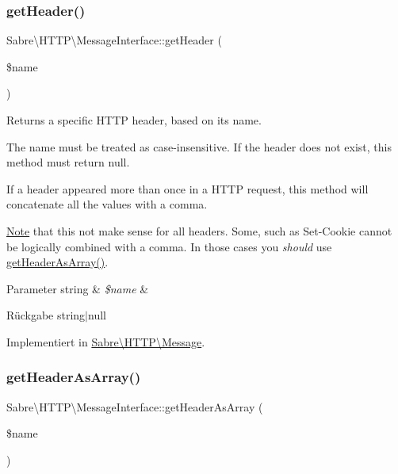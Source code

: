 \subsubsection{\texorpdfstring{get\+Header()}{getHeader()}}
{\footnotesize\ttfamily Sabre\textbackslash{}\+H\+T\+T\+P\textbackslash{}\+Message\+Interface\+::get\+Header (\begin{DoxyParamCaption}\item[{}]{\$name }\end{DoxyParamCaption})}

Returns a specific H\+T\+TP header, based on it\textquotesingle{}s name.

The name must be treated as case-\/insensitive. If the header does not exist, this method must return null.

If a header appeared more than once in a H\+T\+TP request, this method will concatenate all the values with a comma.

\mbox{\hyperlink{class_note}{Note}} that this not make sense for all headers. Some, such as {\ttfamily Set-\/\+Cookie} cannot be logically combined with a comma. In those cases you {\itshape should} use \mbox{\hyperlink{interface_sabre_1_1_h_t_t_p_1_1_message_interface_ab39e08a0f6abaa7540e0ea7e056760b3}{get\+Header\+As\+Array()}}.


\begin{DoxyParams}[1]{Parameter}
string & {\em \$name} & \\
\hline
\end{DoxyParams}
\begin{DoxyReturn}{Rückgabe}
string$\vert$null 
\end{DoxyReturn}


Implementiert in \mbox{\hyperlink{class_sabre_1_1_h_t_t_p_1_1_message_aea639d7fd0ca29dadee89eba3f2e3b8d}{Sabre\textbackslash{}\+H\+T\+T\+P\textbackslash{}\+Message}}.

\mbox{\label{interface_sabre_1_1_h_t_t_p_1_1_message_interface_ab39e08a0f6abaa7540e0ea7e056760b3}} 
\subsubsection{\texorpdfstring{get\+Header\+As\+Array()}{getHeaderAsArray()}}
{\footnotesize\ttfamily Sabre\textbackslash{}\+H\+T\+T\+P\textbackslash{}\+Message\+Interface\+::get\+Header\+As\+Array (\begin{DoxyParamCaption}\item[{}]{\$name }\end{DoxyParamCaption})}

